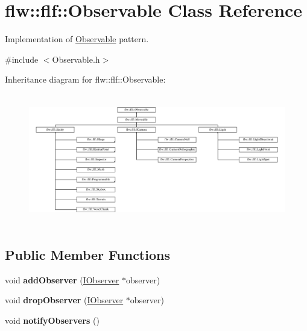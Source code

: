 \hypertarget{classflw_1_1flf_1_1Observable}{}\section{flw\+:\+:flf\+:\+:Observable Class Reference}
\label{classflw_1_1flf_1_1Observable}


Implementation of \hyperlink{classflw_1_1flf_1_1Observable}{Observable} pattern.  




{\ttfamily \#include $<$Observable.\+h$>$}

Inheritance diagram for flw\+:\+:flf\+:\+:Observable\+:\begin{figure}[H]
\begin{center}
\leavevmode
\includegraphics[height=5.767790cm]{classflw_1_1flf_1_1Observable}
\end{center}
\end{figure}
\subsection*{Public Member Functions}
\begin{DoxyCompactItemize}
\item 
\mbox{\label{classflw_1_1flf_1_1Observable_a114471ead1708a2cf2256d06f950f717}} 
void {\bfseries add\+Observer} (\hyperlink{classflw_1_1flf_1_1IObserver}{I\+Observer} $\ast$observer)
\item 
\mbox{\label{classflw_1_1flf_1_1Observable_ab75a0a721f82c3805fe4deac25e67375}} 
void {\bfseries drop\+Observer} (\hyperlink{classflw_1_1flf_1_1IObserver}{I\+Observer} $\ast$observer)
\item 
\mbox{\label{classflw_1_1flf_1_1Observable_ae382cc5ffd147028a0357687c3ab4a40}} 
void {\bfseries notify\+Observers} ()
\end{DoxyCompactItemize}
